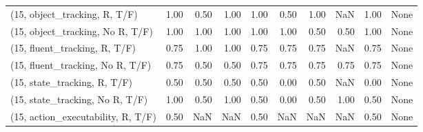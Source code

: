 \begin{table*}[h!]
\begin{adjustbox}{width=2\columnwidth,center}
\begin{tabular}{lrrr|rrr|rrr}
\midrule
(15, object\_tracking, R, T/F)         &                      1.00 &                  0.50 &                      1.00 &                          1.00 &                      0.50 &                          1.00 &                                    NaN &                               1.00 &                                  None \\
(15, object\_tracking, No R, T/F)      &                      1.00 &                  1.00 &                      1.00 &                          1.00 &                      1.00 &                          0.50 &                                   0.50 &                               1.00 &                                  None \\
(15, fluent\_tracking, R, T/F)         &                      0.75 &                  1.00 &                      1.00 &                          0.75 &                      0.75 &                          0.75 &                                    NaN &                               0.75 &                                  None \\
(15, fluent\_tracking, No R, T/F)      &                      0.75 &                  0.50 &                      0.50 &                          0.75 &                      0.75 &                          0.75 &                                   0.75 &                               0.75 &                                  None \\
(15, state\_tracking, R, T/F)          &                      0.50 &                  0.50 &                      0.50 &                          0.50 &                      0.00 &                          0.50 &                                    NaN &                               0.00 &                                  None \\
(15, state\_tracking, No R, T/F)       &                      1.00 &                  0.50 &                      1.00 &                          0.50 &                      0.00 &                          0.50 &                                   1.00 &                               0.50 &                                  None \\
(15, action\_executability, R, T/F)    &                      0.50 &                   NaN &                       NaN &                          0.50 &                       NaN &                           NaN &                                    NaN &                               0.50 &                                  None \\

\end{tabular}
\end{adjustbox}
\end{table*}
